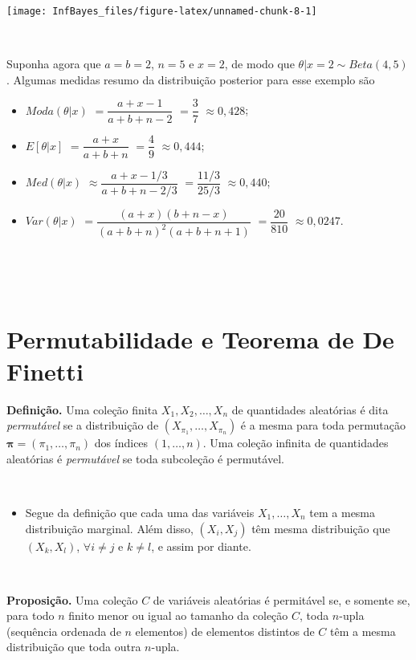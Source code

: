 \documentclass[
]{book}
\providecommand{\tightlist}{%
  \setlength{\itemsep}{0pt}\setlength{\parskip}{0pt}}
\begin{document}
\begin{center}\texttt{[image: InfBayes\_files/figure-latex/unnamed-chunk-8-1]} \end{center}

\(~\)

Suponha agora que \(a=b=2\), \(n=5\) e \(x=2\), de modo que \(\theta|x=2 \sim Beta(4,5)\). Algumas medidas resumo da distribuição posterior para esse exemplo são

\begin{itemize}
\item
  \(Moda(\theta|x)\) \(=\dfrac{a+x-1}{a+b+n-2}\) \(=\dfrac{3}{7}\) \(\approx 0,428\);
\item
  \(E[\theta|x]\) \(=\dfrac{a+x}{a+b+n}\) \(=\dfrac{4}{9}\) \(\approx 0,444\);
\item
  \(Med(\theta|x)\) \(\approx \dfrac{a+x-1/3}{a+b+n-2/3}\) \(=\dfrac{11/3}{25/3}\) \(\approx 0,440\);
\item
  \(Var(\theta|x)\) \(=\dfrac{(a+x)(b+n-x)}{(a+b+n)^2(a+b+n+1)}\) \(=\dfrac{20}{810}\) \(\approx 0,0247\).
\end{itemize}

\(~\)

\(~\)

\hypertarget{permutabilidade-e-teorema-de-de-finetti}{%
\section{Permutabilidade e Teorema de De Finetti}\label{permutabilidade-e-teorema-de-de-finetti}}

\textbf{Definição.} Uma coleção finita \(X_1,X_2,\ldots,X_n\) de quantidades aleatórias é dita \emph{permutável} se a distribuição de \(\left(X_{\pi_1},\ldots,X_{\pi_n}\right)\) é a mesma para toda permutação \(\boldsymbol\pi=(\pi_1,\ldots,\pi_n)\) dos índices \((1,\ldots,n)\). Uma coleção infinita de quantidades aleatórias é \emph{permutável} se toda subcoleção é permutável.

\(~\)

\begin{itemize}
\tightlist
\item
  Segue da definição que cada uma das variáveis \(X_1,\ldots,X_n\) tem a mesma distribuição marginal. Além disso, \((X_i,X_j)\) têm mesma distribuição que \((X_k,X_l)\), \(\forall i\neq j\) e \(k\neq l\), e assim por diante.
\end{itemize}

\(~\)

\textbf{Proposição.} Uma coleção \(C\) de variáveis aleatórias é permitável se, e somente se, para todo \(n\) finito menor ou igual ao tamanho da coleção \(C\), toda \(n\)-upla (sequência ordenada de \(n\) elementos) de elementos distintos de \(C\) têm a mesma distribuição que toda outra \(n\)-upla.
\end{document}
